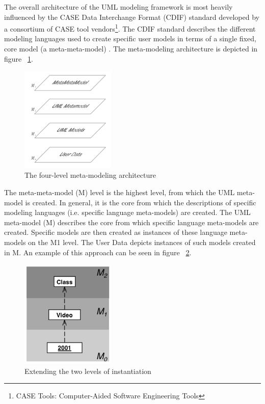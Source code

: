 The overall architecture of the UML modeling framework is most heavily influenced by the CASE Data Interchange Format (CDIF) standard developed by a consortium of CASE tool vendors\footnote{CASE Tools: Computer-Aided Software Engineering Tools}. The CDIF standard describes the different modeling languages used to create specific user models in terms of a single fixed, core model (a meta-meta-model) \cite{RearchitectingUML}. The meta-modeling architecture is depicted in figure ~\ref{fig:mm_architecture}.
\begin{figure}[h!]
\centering
\includegraphics[width=0.4\textwidth]{images/mm_architecture.png}
\caption{The four-level meta-modeling architecture}
\label{fig:mm_architecture}
\end{figure}
The meta-meta-model (M) level is the highest level, from which the UML meta-model is created. In general, it is the core from which the descriptions of specific modeling languages (i.e. specific language meta-models) are created. The UML meta-model (M) describes the core from which specific language meta-models are created. Specific models are then created as instances of these language meta-models on the M1 level. The User Data depicts instances of such models created in M. An example of this approach can be seen in figure ~\ref{fig:two_level_inst}.

\begin{figure}[h!]
\centering
\includegraphics[width=0.4\textwidth]{images/chap2_two_level_inst.png}
\caption{Extending the two levels of instantiation}
\label{fig:two_level_inst}
\end{figure}

